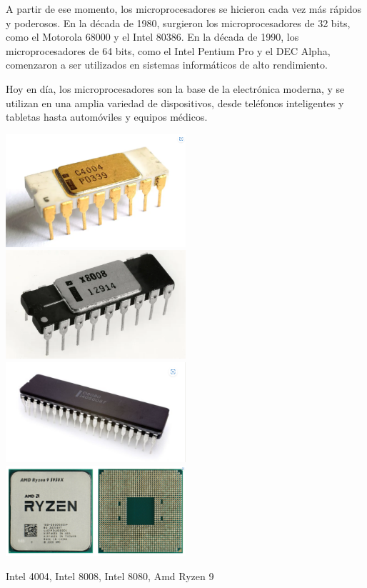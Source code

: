 \documentclass{article}
\begin{document}
A partir de ese momento, los microprocesadores se hicieron cada vez más rápidos y poderosos. En la década de 1980, 
surgieron los microprocesadores de 32 bits, como el Motorola 68000 y el Intel 80386. En la década de 1990, 
los microprocesadores de 64 bits, como el Intel Pentium Pro y el DEC Alpha, comenzaron a ser utilizados 
en sistemas informáticos de alto rendimiento.

Hoy en día, los microprocesadores son la base de la electrónica moderna, y se utilizan en una amplia 
variedad de dispositivos, desde teléfonos inteligentes y tabletas hasta automóviles y equipos médicos.

    \includegraphics[width=0.5\textwidth]{res/intel_4004.png}
    \includegraphics[width=0.5\textwidth]{res/intel_8008.png}
    \includegraphics[width=0.5\textwidth]{res/intel_8080.png}
    \includegraphics[width=0.5\textwidth]{res/amd_ryzen9.png}\\
    \begin{center}
        Intel 4004, Intel 8008, Intel 8080, Amd Ryzen 9
    \end{center}
\end{document}
